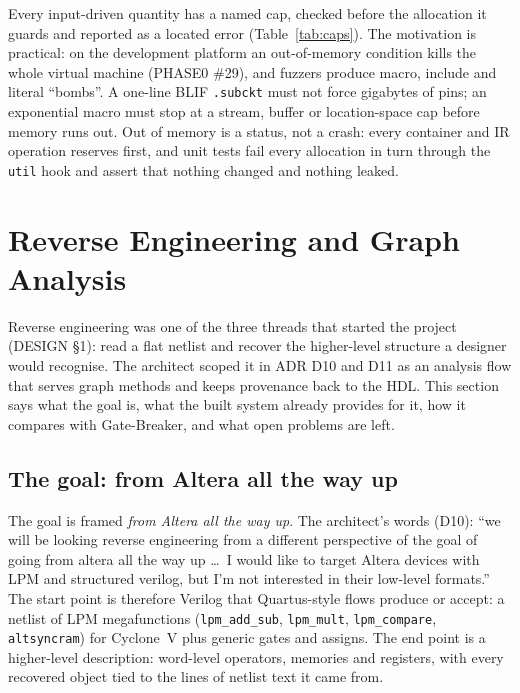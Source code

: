 \documentclass[conference]{IEEEtran}
\newcommand{\code}[1]{\texttt{#1}}
\begin{document}
Every input-driven quantity has a named cap, checked before the allocation it guards and
reported as a located error (Table~\ref{tab:caps}). The motivation is practical: on the
development platform an out-of-memory condition kills the whole virtual machine (PHASE0 \#29),
and fuzzers produce macro, include and literal ``bombs''. A one-line BLIF \code{.subckt} must
not force gigabytes of pins; an exponential macro must stop at a stream, buffer or
location-space cap before memory runs out. Out of memory is a status, not a crash:
every container and IR operation reserves first, and unit tests fail every allocation in turn
through the \code{util} hook and assert that nothing changed and nothing leaked.

\section{Reverse Engineering and Graph Analysis}
\label{sec:re}

Reverse engineering was one of the three threads that started the project (DESIGN \S1): read a
flat netlist and recover the higher-level structure a designer would recognise. The architect
scoped it in ADR D10 and D11 as an analysis flow that serves graph methods and keeps provenance
back to the HDL. This section says what the goal is, what the built system already provides for
it, how it compares with Gate-Breaker, and what open problems are left.

\subsection{The goal: from Altera all the way up}

The goal is framed \emph{from Altera all the way up}. The architect's words (D10): ``we
will be looking reverse engineering from a different perspective of the goal of going from
altera all the way up \ldots\ I would like to target Altera devices with LPM and structured
verilog, but I'm not interested in their low-level formats.'' The start point is therefore Verilog that
Quartus-style flows produce or accept: a netlist of LPM megafunctions (\code{lpm\_add\_sub},
\code{lpm\_mult}, \code{lpm\_compare}, \code{altsyncram}) for Cyclone~V plus generic gates and
assigns. The end point is a higher-level description: word-level operators, memories and
registers, with every recovered object tied to the lines of netlist text it came from.
\end{document}

